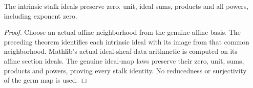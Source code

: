 \begin{lemma}
\label{scheme:ideal-sheaf-data-stalk-arithmetic}
\leanok
{}
The intrinsic stalk ideals preserve zero, unit, ideal sums, products and
all powers, including exponent zero.
\end{lemma}
\begin{proof}
Choose an actual affine neighborhood from the genuine affine basis.
The preceding theorem identifies each intrinsic ideal with its image
from that common neighborhood. Mathlib's actual ideal-sheaf-data arithmetic
is computed on its affine section ideals. The genuine ideal-map laws
preserve their zero, unit, sums, products and powers, proving every
stalk identity. No reducedness or surjectivity of the germ map is used.
\end{proof}


